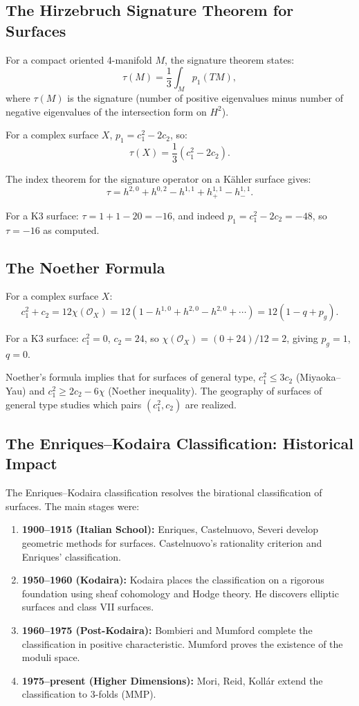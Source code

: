 \subsection{The Hirzebruch Signature Theorem for Surfaces}

For a compact oriented 4-manifold $M$, the signature theorem states:
\[
\tau(M) = \frac{1}{3} \int_M p_1(TM),
\]
where $\tau(M)$ is the signature (number of positive eigenvalues minus number of negative eigenvalues of the intersection form on $H^2$).

For a complex surface $X$, $p_1 = c_1^2 - 2c_2$, so:
\[
\tau(X) = \frac{1}{3} (c_1^2 - 2c_2).
\]

The index theorem for the signature operator on a K\"{a}hler surface gives:
\[
\tau = h^{2,0} + h^{0,2} - h^{1,1} + h^{1,1}_+ - h^{1,1}_-.
\]

For a K3 surface: $\tau = 1 + 1 - 20 = -16$, and indeed $p_1 = c_1^2 - 2c_2 = -48$, so $\tau = -16$ as computed.

\subsection{The Noether Formula}

For a complex surface $X$:
\[
c_1^2 + c_2 = 12 \chi(\mathcal{O}_X) = 12(1 - h^{1,0} + h^{2,0} - h^{2,0} + \cdots) = 12(1 - q + p_g).
\]

For a K3 surface: $c_1^2 = 0$, $c_2 = 24$, so $\chi(\mathcal{O}_X) = (0 + 24)/12 = 2$, giving $p_g = 1$, $q = 0$.

Noether's formula implies that for surfaces of general type, $c_1^2 \leq 3c_2$ (Miyaoka--Yau) and $c_1^2 \geq 2c_2 - 6\chi$ (Noether inequality). The geography of surfaces of general type studies which pairs $(c_1^2, c_2)$ are realized.

\subsection{The Enriques--Kodaira Classification: Historical Impact}

The Enriques--Kodaira classification resolves the birational classification of surfaces. The main stages were:
\begin{enumerate}
    \item \textbf{1900--1915 (Italian School):} Enriques, Castelnuovo, Severi develop geometric methods for surfaces. Castelnuovo's rationality criterion and Enriques' classification.
    \item \textbf{1950--1960 (Kodaira):} Kodaira places the classification on a rigorous foundation using sheaf cohomology and Hodge theory. He discovers elliptic surfaces and class VII surfaces.
    \item \textbf{1960--1975 (Post-Kodaira):} Bombieri and Mumford complete the classification in positive characteristic. Mumford proves the existence of the moduli space.
    \item \textbf{1975--present (Higher Dimensions):} Mori, Reid, Koll\'{a}r extend the classification to 3-folds (MMP).
\end{enumerate}

